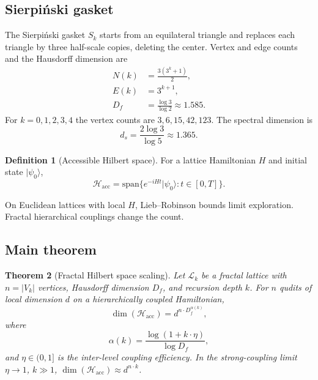 \documentclass[aps,prx,twocolumn,superscriptaddress,floatfix]{revtex4-2}
\newcommand{\Hilbert}{\mathcal{H}}
\newcommand{\Df}{D_f}
\theoremstyle{plain}
\newtheorem{theorem}{Theorem}[section]
\theoremstyle{definition}
\newtheorem{definition}[theorem]{Definition}
\begin{document}
\subsection{Sierpi\'{n}ski gasket}

The Sierpi\'{n}ski gasket $S_k$ starts from an equilateral triangle and replaces each triangle by three half-scale copies, deleting the center. Vertex and edge counts and the Hausdorff dimension are
\begin{align}
N(k) &= \frac{3(3^k + 1)}{2}, \\
E(k) &= 3^{k+1}, \\
\Df &= \frac{\log 3}{\log 2} \approx 1.585.
\end{align}
For $k = 0,1,2,3,4$ the vertex counts are $3,6,15,42,123$. The spectral dimension is
\begin{equation}
d_s = \frac{2\log 3}{\log 5} \approx 1.365.
\end{equation}

\begin{definition}[Accessible Hilbert space]
For a lattice Hamiltonian $H$ and initial state $|\psi_0\rangle$,
\begin{equation}
\Hilbert_{\mathrm{acc}} = \mathrm{span}\bigl\{ e^{-iHt}|\psi_0\rangle : t \in [0,T] \bigr\}.
\end{equation}
\end{definition}

On Euclidean lattices with local $H$, Lieb--Robinson bounds limit exploration. Fractal hierarchical couplings change the count.

\subsection{Main theorem}

\begin{theorem}[Fractal Hilbert space scaling]
\label{thm:main}
Let $\mathcal{L}_k$ be a fractal lattice with $n = |V_k|$ vertices, Hausdorff dimension $\Df$, and recursion depth $k$. For $n$ qudits of local dimension $d$ on a hierarchically coupled Hamiltonian,
\begin{equation}
\dim(\Hilbert_{\mathrm{acc}}) = d^{n \cdot \Df^{\alpha(k)}},
\label{eq:main_theorem}
\end{equation}
where
\begin{equation}
\alpha(k) = \frac{\log(1 + k\cdot\eta)}{\log \Df},
\label{eq:alpha_def}
\end{equation}
and $\eta \in (0,1]$ is the inter-level coupling efficiency. In the strong-coupling limit $\eta \to 1$, $k \gg 1$, $\dim(\Hilbert_{\mathrm{acc}}) \approx d^{n\cdot k}$.
\end{theorem}
\end{document}
